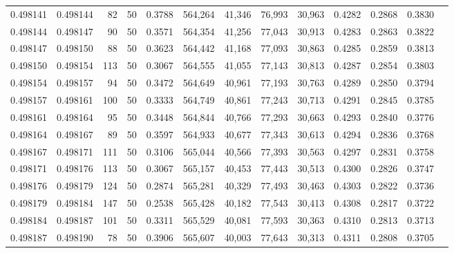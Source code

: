 \begin{tabular}{rrrrrrrrrrrrr}
0.498141 & 0.498144 &    82 &  50 &                                     0.3788 & 564,264 &  41,346 &  76,993 &  30,963 & 0.4282 & 0.2868 & 0.3830 \\
0.498144 & 0.498147 &    90 &  50 &                                     0.3571 & 564,354 &  41,256 &  77,043 &  30,913 & 0.4283 & 0.2863 & 0.3822 \\
0.498147 & 0.498150 &    88 &  50 &                                     0.3623 & 564,442 &  41,168 &  77,093 &  30,863 & 0.4285 & 0.2859 & 0.3813 \\
0.498150 & 0.498154 &   113 &  50 &                                     0.3067 & 564,555 &  41,055 &  77,143 &  30,813 & 0.4287 & 0.2854 & 0.3803 \\
0.498154 & 0.498157 &    94 &  50 &                                     0.3472 & 564,649 &  40,961 &  77,193 &  30,763 & 0.4289 & 0.2850 & 0.3794 \\
0.498157 & 0.498161 &   100 &  50 &                                     0.3333 & 564,749 &  40,861 &  77,243 &  30,713 & 0.4291 & 0.2845 & 0.3785 \\
0.498161 & 0.498164 &    95 &  50 &                                     0.3448 & 564,844 &  40,766 &  77,293 &  30,663 & 0.4293 & 0.2840 & 0.3776 \\
0.498164 & 0.498167 &    89 &  50 &                                     0.3597 & 564,933 &  40,677 &  77,343 &  30,613 & 0.4294 & 0.2836 & 0.3768 \\
0.498167 & 0.498171 &   111 &  50 &                                     0.3106 & 565,044 &  40,566 &  77,393 &  30,563 & 0.4297 & 0.2831 & 0.3758 \\
0.498171 & 0.498176 &   113 &  50 &                                     0.3067 & 565,157 &  40,453 &  77,443 &  30,513 & 0.4300 & 0.2826 & 0.3747 \\
0.498176 & 0.498179 &   124 &  50 &                                     0.2874 & 565,281 &  40,329 &  77,493 &  30,463 & 0.4303 & 0.2822 & 0.3736 \\
0.498179 & 0.498184 &   147 &  50 &                                     0.2538 & 565,428 &  40,182 &  77,543 &  30,413 & 0.4308 & 0.2817 & 0.3722 \\
0.498184 & 0.498187 &   101 &  50 &                                     0.3311 & 565,529 &  40,081 &  77,593 &  30,363 & 0.4310 & 0.2813 & 0.3713 \\
0.498187 & 0.498190 &    78 &  50 &                                     0.3906 & 565,607 &  40,003 &  77,643 &  30,313 & 0.4311 & 0.2808 & 0.3705 \\

\end{tabular}
